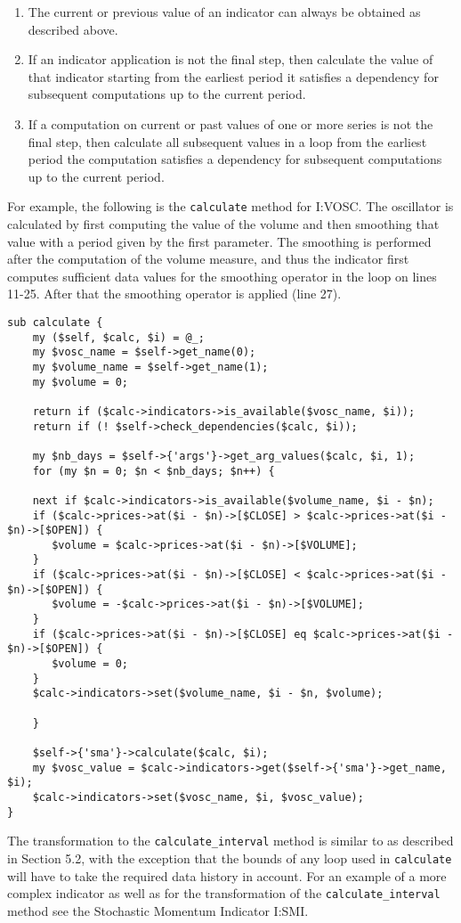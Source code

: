 \documentclass[11pt,twoside]{article}
\begin{document}
\begin{enumerate}
\item The current or previous value of an indicator can always be obtained
as described above.
\item If an indicator application is not the final step, then calculate the
value of that indicator starting from the earliest period it satisfies
a dependency for subsequent computations up to the current period.
\item If a computation on current or past values of one or more series is
not the final step, then calculate all subsequent values in a loop from
the earliest period the computation satisfies a dependency for
subsequent computations up to the current period.
\end{enumerate}

For example, the following is the \lstinline!calculate! method
for I:VOSC. The oscillator is calculated by first computing the value
of the volume and then smoothing that value with a period given by the
first parameter. The smoothing is performed after the computation of
the volume measure, and thus the indicator first computes sufficient
data values for the smoothing operator in the loop on lines 11-25.
After that the smoothing operator is applied (line 27).

\begin{lstlisting}[numbers=none]
sub calculate {
    my ($self, $calc, $i) = @_;
    my $vosc_name = $self->get_name(0);
    my $volume_name = $self->get_name(1);
    my $volume = 0;

    return if ($calc->indicators->is_available($vosc_name, $i));
    return if (! $self->check_dependencies($calc, $i));

    my $nb_days = $self->{'args'}->get_arg_values($calc, $i, 1);
    for (my $n = 0; $n < $nb_days; $n++) {

    next if $calc->indicators->is_available($volume_name, $i - $n);
    if ($calc->prices->at($i - $n)->[$CLOSE] > $calc->prices->at($i - $n)->[$OPEN]) {
       $volume = $calc->prices->at($i - $n)->[$VOLUME];
    }
    if ($calc->prices->at($i - $n)->[$CLOSE] < $calc->prices->at($i - $n)->[$OPEN]) {
       $volume = -$calc->prices->at($i - $n)->[$VOLUME];
    }
    if ($calc->prices->at($i - $n)->[$CLOSE] eq $calc->prices->at($i - $n)->[$OPEN]) {
       $volume = 0;
    }
    $calc->indicators->set($volume_name, $i - $n, $volume);

    }

    $self->{'sma'}->calculate($calc, $i);
    my $vosc_value = $calc->indicators->get($self->{'sma'}->get_name, $i);
    $calc->indicators->set($vosc_name, $i, $vosc_value);
}
\end{lstlisting}
The transformation to the \lstinline!calculate_interval! method
is similar to as described in Section 5.2, with the exception that the
bounds of any loop used in \lstinline!calculate! will have to
take the required data history in account. For an example of a more
complex indicator as well as for the transformation of the
\lstinline!calculate_interval! method see the Stochastic
Momentum Indicator I:SMI.
\end{document}
